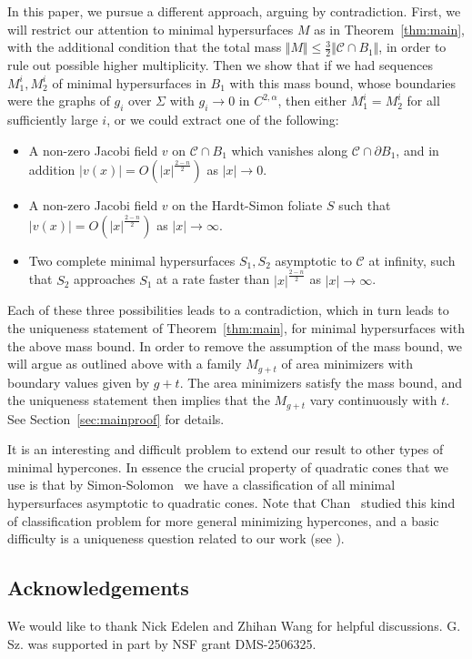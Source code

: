 \documentclass[12pt, reqno ]{amsart}
\numberwithin{equation}{section}
\begin{document}
In this paper, we pursue a different approach, arguing by
contradiction. First, we will restrict our attention to minimal hypersurfaces $M$ as in Theorem~\ref{thm:main}, with the additional condition that the total mass $\Vert M\Vert \leq \frac{3}{2}\Vert \mathcal{C}\cap B_1\Vert$, in order to rule out possible higher multiplicity. Then we show that if we had sequences $M^i_1,
M^i_2$ of minimal hypersurfaces in $B_1$ with this mass bound, whose boundaries were the graphs of $g_i$ over $\Sigma$ with $g_i \to 0$ in $C^{2,\alpha}$,  then either $M^i_1 = M^i_2$ for all sufficiently large
$i$, or we could extract one of the following:
\begin{itemize}
  \item A non-zero Jacobi field $v$ on $\mathcal{C}\cap B_1$ which vanishes
    along $\mathcal{C}\cap \partial B_1$, and in addition $|v(x)| =
    O(|x|^{\frac{2-n}{2}})$ as $|x|\to 0$.
  \item A non-zero Jacobi field $v$ on the Hardt-Simon foliate $S$
    such that $|v(x)| = O(|x|^{\frac{2-n}{2}})$ as $|x| \to \infty$.
  \item Two complete minimal hypersurfaces $S_1, S_2$ asymptotic to
    $\mathcal{C}$ at infinity, such that $S_2$ approaches $S_1$ at a
    rate faster than $|x|^{\frac{2-n}{2}}$ as $|x|\to\infty$.
\end{itemize}
Each of these three possibilities leads to a contradiction, which in
turn leads to the uniqueness statement of Theorem~\ref{thm:main}, for minimal hypersurfaces with the above mass bound. In order to remove the assumption of the mass bound, we will argue as outlined above with a family $M_{g+t}$ of area minimizers with boundary values given by $g+t$. The area minimizers satisfy the mass bound, and the uniqueness statement then implies that the $M_{g+t}$ vary continuously with $t$. See Section~\ref{sec:mainproof} for details.


It is an interesting and difficult problem to extend our result to
other types of minimal hypercones. In essence the crucial property of
quadratic cones that we use is that by Simon-Solomon~\cite{SimonSolomon} we
have a classification of all minimal hypersurfaces asymptotic to
quadratic cones. Note that Chan~\cite{Chan97} studied this kind of
classification problem for more general minimizing hypercones, and a
basic difficulty is a uniqueness question related to our work (see
\cite[Remark (1) on p. 180]{Chan97}). 


\subsection*{Acknowledgements}
We would like to thank Nick Edelen and Zhihan Wang for helpful discussions. G. Sz. was supported in part by NSF grant DMS-2506325.
\end{document}
